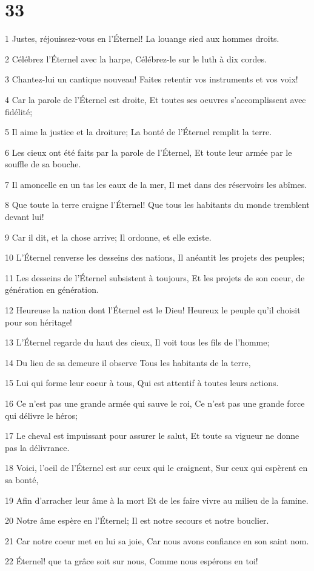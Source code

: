 \chapter{33}

\par 1 Justes, réjouissez-vous en l'Éternel! La louange sied aux hommes droits.
\par 2 Célébrez l'Éternel avec la harpe, Célébrez-le sur le luth à dix cordes.
\par 3 Chantez-lui un cantique nouveau! Faites retentir vos instruments et vos voix!
\par 4 Car la parole de l'Éternel est droite, Et toutes ses oeuvres s'accomplissent avec fidélité;
\par 5 Il aime la justice et la droiture; La bonté de l'Éternel remplit la terre.
\par 6 Les cieux ont été faits par la parole de l'Éternel, Et toute leur armée par le souffle de sa bouche.
\par 7 Il amoncelle en un tas les eaux de la mer, Il met dans des réservoirs les abîmes.
\par 8 Que toute la terre craigne l'Éternel! Que tous les habitants du monde tremblent devant lui!
\par 9 Car il dit, et la chose arrive; Il ordonne, et elle existe.
\par 10 L'Éternel renverse les desseins des nations, Il anéantit les projets des peuples;
\par 11 Les desseins de l'Éternel subsistent à toujours, Et les projets de son coeur, de génération en génération.
\par 12 Heureuse la nation dont l'Éternel est le Dieu! Heureux le peuple qu'il choisit pour son héritage!
\par 13 L'Éternel regarde du haut des cieux, Il voit tous les fils de l'homme;
\par 14 Du lieu de sa demeure il observe Tous les habitants de la terre,
\par 15 Lui qui forme leur coeur à tous, Qui est attentif à toutes leurs actions.
\par 16 Ce n'est pas une grande armée qui sauve le roi, Ce n'est pas une grande force qui délivre le héros;
\par 17 Le cheval est impuissant pour assurer le salut, Et toute sa vigueur ne donne pas la délivrance.
\par 18 Voici, l'oeil de l'Éternel est sur ceux qui le craignent, Sur ceux qui espèrent en sa bonté,
\par 19 Afin d'arracher leur âme à la mort Et de les faire vivre au milieu de la famine.
\par 20 Notre âme espère en l'Éternel; Il est notre secours et notre bouclier.
\par 21 Car notre coeur met en lui sa joie, Car nous avons confiance en son saint nom.
\par 22 Éternel! que ta grâce soit sur nous, Comme nous espérons en toi!

